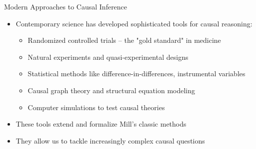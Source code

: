 \documentclass{beamer}
\begin{document}
\begin{frame}{Modern Approaches to Causal Inference}
    \begin{itemize}
        \item Contemporary science has developed sophisticated tools for causal reasoning:
            \begin{itemize}
                \item Randomized controlled trials – the "gold standard" in medicine
                \item Natural experiments and quasi-experimental designs
                \item Statistical methods like difference-in-differences, instrumental variables
                \item Causal graph theory and structural equation modeling
                \item Computer simulations to test causal theories
            \end{itemize}
        \item These tools extend and formalize Mill's classic methods
        \item They allow us to tackle increasingly complex causal questions
    \end{itemize}
    
    \begin{center}
    \end{center}
\end{frame}
\end{document}
